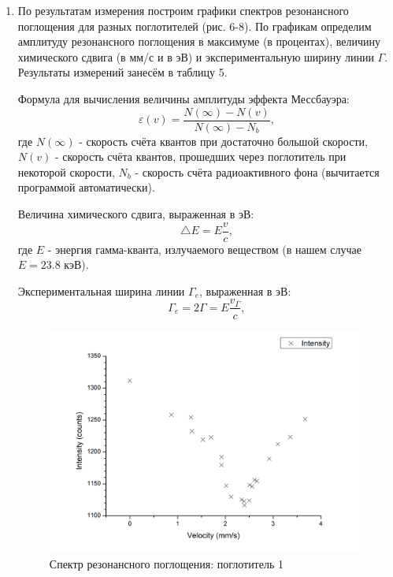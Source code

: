 \documentclass[a4paper]{article}
\begin{document}
\begin{enumerate}
\item По результатам измерения построим графики спектров резонансного поглощения для разных поглотителей (рис. 6-8). По графикам определим амплитуду резонансного поглощения в максимуме (в процентах), величину химического сдвига (в мм/с и в эВ) и экспериментальную ширину линии $\Gamma$. Результаты измерений занесём в таблицу 5. \par

Формула для вычисления величины амплитуды эффекта Мессбауэра:
\begin{equation}
    \varepsilon(v) = \frac{N(\infty) - N(v)}{N(\infty) - N_b},
\end{equation}
где $N(\infty)$ - скорость счёта квантов при достаточно большой скорости, $N(v)$ - скорость счёта квантов, прошедших через поглотитель при некоторой скорости, $N_b$ - скорость счёта радиоактивного фона (вычитается программой автоматически). \par
Величина химического сдвига, выраженная в эВ:
\begin{equation}
    \triangle E = E \frac{v}{c},
\end{equation}
где $E$ - энергия гамма-кванта, излучаемого веществом (в нашем случае $E = 23.8$ кэВ). \par
Экспериментальная ширина линии $\Gamma_e$, выраженная в эВ:
\begin{equation}
    \Gamma_e = 2 \Gamma = E \frac{v_{\Gamma}}{c},
\end{equation}


\begin{figure}[h]
    \centering
    \includegraphics[width=12cm]{Graph2}
    \caption{Спектр резонансного поглощения: поглотитель 1}
    \label{fig:vac}
\end{figure}


\end{enumerate}
\end{document}

